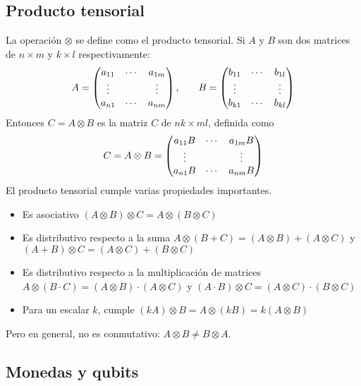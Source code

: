 \subsection{Producto tensorial}
\label{sss:producto-tensorial}

La operación $\otimes$ se define como el producto tensorial.  Si $A$ y $B$ 
son dos matrices de $n \times m$ y $k \times l$ respectivamente:
%
$$
\begin{array}{c c}
	A=\begin{pmatrix} 
		a_{11} & \cdots & a_{1m} \\
		\vdots &        & \vdots \\
		a_{n1} & \cdots & a_{nm}
	 \end{pmatrix}
	,\quad
	&
	B=\begin{pmatrix} 
		b_{11} & \cdots & b_{1l} \\
		\vdots &        & \vdots \\
		b_{k1} & \cdots & b_{kl}
	 \end{pmatrix}
\end{array}
$$
%
Entonces $C = A \otimes B$ es la matriz $C$ de $nk \times ml$, 
definida como
%
$$
C = A \otimes B = \begin{pmatrix} 
	a_{11} B & \cdots & a_{1m} B \\
	\vdots   &        & \vdots   \\
	a_{n1} B & \cdots & a_{nm} B
 \end{pmatrix}
$$
%
El producto tensorial cumple varias propiedades importantes.
%
\begin{itemize}
\item Es asociativo $(A \otimes B) \otimes C = A \otimes (B \otimes C)$

\item Es distributivo respecto a la suma $A \otimes (B + C) = (A \otimes B) + (A
\otimes C) $ y $(A + B) \otimes C = (A \otimes C) + (B \otimes C)$

\item Es distributivo respecto a la multiplicación de matrices $A \otimes (B 
\cdot C) = (A \otimes B) \cdot (A \otimes C) $ y $(A \cdot B) \otimes C = (A 
\otimes C) \cdot (B \otimes C)$

\item Para un escalar $k$, cumple $(kA) \otimes B = A \otimes (kB) = k (A 
\otimes B)$
\end{itemize}
%
Pero en general, no es conmutativo: $A \otimes B \neq B \otimes A$.

\subsection{Monedas y qubits}

